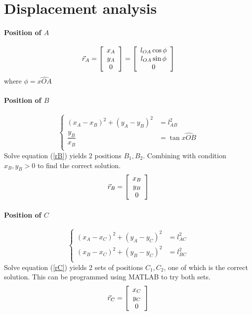 \section{Displacement analysis}
\paragraph{Position of $ A $}
\begin{equation}\label{rA}
\vec{r}_A=
\left[ \begin{array}{c} x_A\\ y_A\\ 0 \end{array} \right]=\left[ \begin{array}{c} l_{OA}\cos \phi\\ l_{OA}\sin \phi\\ 0 \end{array} \right]
\end{equation}
where $ \phi=\widehat {xOA} $
\paragraph{Position of $ B $}
\begin{equation}\label{rB}
	\left\{
		\begin{array}{cl}
		(x_A-x_B)^2+(y_A-y_B)^2&=l_{AB}^2\\
		\dfrac{y_B}{x_B}&=\tan \widehat{xOB}\\
		\end{array}
	\right.
\end{equation}
Solve equation (\ref{rB}) yields 2 positions $ B_1, B_2 $. Combining with condition $ x_B,y_B>0 $ to find the correct solution.
\[\vec{r}_B=
\left[ \begin{array}{c} x_B\\ y_B\\ 0 \end{array} \right]\]
\paragraph{Position of $ C $}
\begin{equation}\label{rC}
\left\{
\begin{array}{cl}
(x_A-x_C)^2+(y_A-y_C)^2&=l_{AC}^2\\
(x_B-x_C)^2+(y_B-y_C)^2&=l_{BC}^2\\
\end{array}
\right.
\end{equation}
Solve equation (\ref{rC}) yields 2 sets of positions $ C_1, C_2 $, one of which is the correct solution. This can be programmed using MATLAB\textup{\textregistered} to try both sets.
\[\vec{r}_C=
\left[ \begin{array}{c} x_C\\ y_C\\ 0 \end{array} \right]\]
